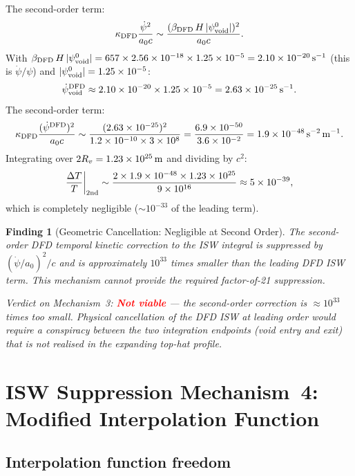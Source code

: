 \documentclass[11pt]{article}
\newtheorem{finding}{Finding}
\newcommand{\ee}[1]{\times 10^{#1}}
\newcommand{\DFD}{{\rm DFD}}
\newcommand{\deltaT}{\Delta T}
\begin{document}
The second-order term:
\begin{equation}
  \kappa_{\DFD}\frac{\dot\psi^2}{a_0 c}
  \sim \frac{(\beta_{\DFD}\,H\,|\psi_{\rm void}^0|)^2}{a_0 c}.
\end{equation}
With $\beta_{\DFD}\,H\,|\psi_{\rm void}^0| = 657\times 2.56\ee{-18}
\times 1.25\ee{-5} = 2.10\ee{-20}\,{\rm s}^{-1}$ (this is
$\dot\psi/\psi$) and $|\psi_{\rm void}^0| = 1.25\ee{-5}$:
\[
  \dot\psi_{\rm void}^{\DFD} \approx 2.10\ee{-20}\times 1.25\ee{-5}
  = 2.63\ee{-25}\,{\rm s}^{-1}.
\]
The second-order term:
\begin{equation}
  \kappa_{\DFD}\frac{(\dot\psi^{\DFD})^2}{a_0 c}
  \sim \frac{(2.63\ee{-25})^2}{1.2\ee{-10}\times 3\ee{8}}
  = \frac{6.9\ee{-50}}{3.6\ee{-2}}
  = 1.9\ee{-48}\,{\rm s}^{-2}\,{\rm m}^{-1}.
\end{equation}
Integrating over $2R_v = 1.23\ee{25}\,{\rm m}$ and dividing by $c^2$:
\[
  \frac{\deltaT}{T}\bigg|_{\rm 2nd}
  \sim \frac{2\times 1.9\ee{-48}\times 1.23\ee{25}}{9\ee{16}}
  \approx 5\ee{-39},
\]
which is completely negligible ($\sim 10^{-33}$ of the leading term).

\begin{finding}[Geometric Cancellation: Negligible at Second Order]\label{find:geometric}
The second-order DFD temporal kinetic correction to the ISW integral
is suppressed by $(\dot\psi/a_0)^2/c$ and is approximately $10^{33}$
times smaller than the leading DFD ISW term.  This mechanism cannot
provide the required factor-of-21 suppression.

\textit{Verdict on Mechanism~3:} \textcolor{red}{\textbf{Not viable}} ---
the second-order correction is $\approx 10^{33}$ times too small.
Physical cancellation of the DFD ISW at leading order would require a
conspiracy between the two integration endpoints (void entry and exit)
that is not realised in the expanding top-hat profile.
\end{finding}

\section{ISW Suppression Mechanism~4: Modified Interpolation Function}
\label{sec:mechanism4-interp}

\subsection{Interpolation function freedom}
\end{document}
